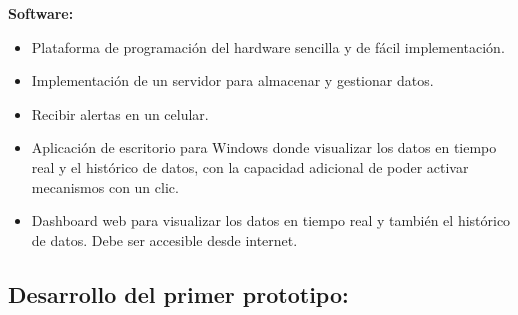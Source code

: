 \textbf{Software:}
\begin{itemize}
	\item Plataforma de programación del hardware sencilla y de fácil implementación.
	\item Implementación de un servidor para almacenar y gestionar datos.
	\item Recibir alertas en un celular.
	\item Aplicación de escritorio para Windows donde visualizar los datos en tiempo real y el histórico de datos, con la capacidad adicional de poder activar mecanismos con un clic.
	\item Dashboard web para visualizar los datos en tiempo real y también el histórico de datos. Debe ser accesible desde internet.
\end{itemize}

\subsection{Desarrollo del primer prototipo:}

